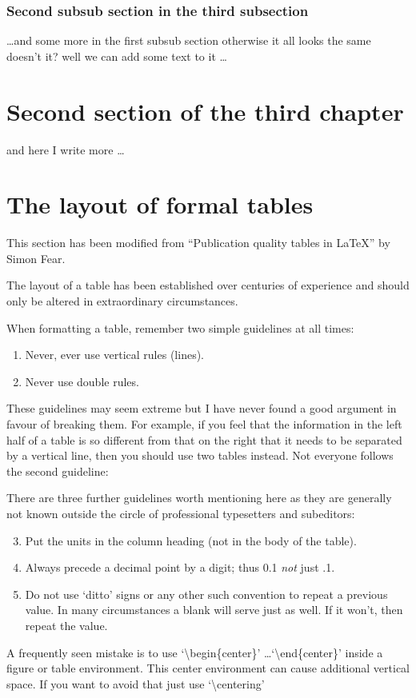 \subsubsection{Second subsub section in the third subsection}
\dots and some more in the first subsub section otherwise it all looks the same
doesn't it? well we can add some text to it \dots

\section{Second section of the third chapter}
and here I write more \dots

\section{The layout of formal tables}
This section has been modified from ``Publication quality tables in \LaTeX*''
 by Simon Fear.

The layout of a table has been established over centuries of experience and 
should only be altered in extraordinary circumstances. 

When formatting a table, remember two simple guidelines at all times:

\begin{enumerate}
  \item Never, ever use vertical rules (lines).
  \item Never use double rules.
\end{enumerate}

These guidelines may seem extreme but I have
never found a good argument in favour of breaking them. For
example, if you feel that the information in the left half of
a table is so different from that on the right that it needs
to be separated by a vertical line, then you should use two
tables instead. Not everyone follows the second guideline:

There are three further guidelines worth mentioning here as they
are generally not known outside the circle of professional
typesetters and subeditors:

\begin{enumerate}\setcounter{enumi}{2}
  \item Put the units in the column heading (not in the body of
          the table).
  \item Always precede a decimal point by a digit; thus 0.1
      {\em not} just .1.
  \item Do not use `ditto' signs or any other such convention to
      repeat a previous value. In many circumstances a blank
      will serve just as well. If it won't, then repeat the value.
\end{enumerate}

A frequently seen mistake is to use `\textbackslash begin\{center\}' \dots `\textbackslash end\{center\}' inside a figure or table environment. This center environment can cause additional vertical space. If you want to avoid that just use `\textbackslash centering'








